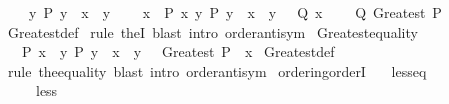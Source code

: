 \begin{isabellebody}
\ \ \ \ {\isasymAnd}y{\isachardot}{\kern0pt}\ P\ y\ {\isasymLongrightarrow}\ x\ {\isasymge}\ y{\isacharsemicolon}{\kern0pt}\isanewline
\ \ \ \ {\isasymAnd}x{\isachardot}{\kern0pt}\ {\isasymlbrakk}\ P\ x{\isacharsemicolon}{\kern0pt}\ {\isasymforall}y{\isachardot}{\kern0pt}\ P\ y\ {\isasymlongrightarrow}\ x\ {\isasymge}\ y\ {\isasymrbrakk}\ {\isasymLongrightarrow}\ Q\ x\ {\isasymrbrakk}\isanewline
\ \ {\isasymLongrightarrow}\ Q\ {\isacharparenleft}{\kern0pt}Greatest\ P{\isacharparenright}{\kern0pt}{\isachardoublequoteclose}\isanewline
%
\isadelimproof
%
\endisadelimproof
%
\isatagproof
{}\isamarkupfalse%
\ Greatest{\isacharunderscore}{\kern0pt}def\isanewline
{}\isamarkupfalse%
\ {\isacharparenleft}{\kern0pt}rule\ theI{}{\isacharparenright}{\kern0pt}\ {\isacharparenleft}{\kern0pt}blast\ intro{\isacharcolon}{\kern0pt}\ order{\isachardot}{\kern0pt}antisym{\isacharparenright}{\kern0pt}{\isacharplus}{\kern0pt}%
\endisatagproof
{\isafoldproof}%
%
\isadelimproof
\isanewline
%
\endisadelimproof
\isanewline
{}\isamarkupfalse%
\ Greatest{\isacharunderscore}{\kern0pt}equality{\isacharcolon}{\kern0pt}\isanewline
\ \ {\isachardoublequoteopen}{\isasymlbrakk}\ P\ x{\isacharsemicolon}{\kern0pt}\ \ {\isasymAnd}y{\isachardot}{\kern0pt}\ P\ y\ {\isasymLongrightarrow}\ x\ {\isasymge}\ y\ {\isasymrbrakk}\ {\isasymLongrightarrow}\ Greatest\ P\ {\isacharequal}{\kern0pt}\ x{\isachardoublequoteclose}\isanewline
%
\isadelimproof
%
\endisadelimproof
%
\isatagproof
{}\isamarkupfalse%
\ Greatest{\isacharunderscore}{\kern0pt}def\isanewline
{}\isamarkupfalse%
\ {\isacharparenleft}{\kern0pt}rule\ the{\isacharunderscore}{\kern0pt}equality{\isacharparenright}{\kern0pt}\ {\isacharparenleft}{\kern0pt}blast\ intro{\isacharcolon}{\kern0pt}\ order{\isachardot}{\kern0pt}antisym{\isacharparenright}{\kern0pt}{\isacharplus}{\kern0pt}%
\endisatagproof
{\isafoldproof}%
%
\isadelimproof
\isanewline
%
\endisadelimproof
\isanewline
{}\isamarkupfalse%
\isanewline
\isanewline
{}\isamarkupfalse%
\ ordering{\isacharunderscore}{\kern0pt}orderI{\isacharcolon}{\kern0pt}\isanewline
\ \ \ less{\isacharunderscore}{\kern0pt}eq\ {\isacharparenleft}{\kern0pt}\ {\isachardoublequoteopen}\isactrlbold {\isasymle}{\isachardoublequoteclose}\ {}{}{\isacharparenright}{\kern0pt}\isanewline
\ \ \ \ \ less\ {\isacharparenleft}{\kern0pt}\ {\isachardoublequoteopen}\isactrlbold {\isacharless}{\kern0pt}{\isachardoublequoteclose}\ {}{}{\isacharparenright}{\kern0pt}\isanewline

\end{isabellebody}
